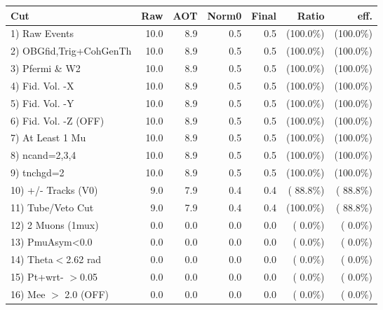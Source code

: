  \begin{table}[h!]\centering
 \begin{tabular}{||l||r|r|r|r|r|r||}
 \hline
 \hline
 Cut & Raw & AOT & Norm0 & Final & Ratio & eff.       \\
 \hline
  1) Raw Events           &         10.0 &          8.9 &          0.5 &          0.5 & (100.0\%) & (100.0\%) \\
  2) OBGfid,Trig+CohGenTh &         10.0 &          8.9 &          0.5 &          0.5 & (100.0\%) & (100.0\%) \\
  3) Pfermi \& W2         &         10.0 &          8.9 &          0.5 &          0.5 & (100.0\%) & (100.0\%) \\
  4) Fid. Vol. -X         &         10.0 &          8.9 &          0.5 &          0.5 & (100.0\%) & (100.0\%) \\
  5) Fid. Vol. -Y         &         10.0 &          8.9 &          0.5 &          0.5 & (100.0\%) & (100.0\%) \\
  6) Fid. Vol. -Z (OFF)   &         10.0 &          8.9 &          0.5 &          0.5 & (100.0\%) & (100.0\%) \\
  7) At Least 1 Mu        &         10.0 &          8.9 &          0.5 &          0.5 & (100.0\%) & (100.0\%) \\
  8) ncand=2,3,4          &         10.0 &          8.9 &          0.5 &          0.5 & (100.0\%) & (100.0\%) \\
  9) tnchgd=2             &         10.0 &          8.9 &          0.5 &          0.5 & (100.0\%) & (100.0\%) \\
 10) +/- Tracks (V0)      &          9.0 &          7.9 &          0.4 &          0.4 & ( 88.8\%) & ( 88.8\%) \\
 11) Tube/Veto Cut        &          9.0 &          7.9 &          0.4 &          0.4 & (100.0\%) & ( 88.8\%) \\
 12) 2 Muons (1mux)       &          0.0 &          0.0 &          0.0 &          0.0 & (  0.0\%) & (  0.0\%) \\
 13) PmuAsym<0.0          &          0.0 &          0.0 &          0.0 &          0.0 & (  0.0\%) & (  0.0\%) \\
 14) Theta$<$2.62 rad     &          0.0 &          0.0 &          0.0 &          0.0 & (  0.0\%) & (  0.0\%) \\
 15) Pt+wrt- $>$0.05      &          0.0 &          0.0 &          0.0 &          0.0 & (  0.0\%) & (  0.0\%) \\
 16) Mee $>$ 2.0  (OFF)   &          0.0 &          0.0 &          0.0 &          0.0 & (  0.0\%) & (  0.0\%) \\

\end{tabular}
\end{table}
